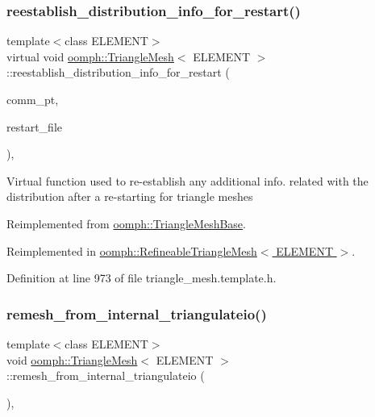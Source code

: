 \subsubsection{\texorpdfstring{reestablish\+\_\+distribution\+\_\+info\+\_\+for\+\_\+restart()}{reestablish\_distribution\_info\_for\_restart()}}
{\footnotesize\ttfamily template$<$class E\+L\+E\+M\+E\+NT$>$ \\
virtual void \hyperlink{classoomph_1_1TriangleMesh}{oomph\+::\+Triangle\+Mesh}$<$ E\+L\+E\+M\+E\+NT $>$\+::reestablish\+\_\+distribution\+\_\+info\+\_\+for\+\_\+restart (\begin{DoxyParamCaption}\item[{\hyperlink{classoomph_1_1OomphCommunicator}{Oomph\+Communicator} $\ast$}]{comm\+\_\+pt,  }\item[{std\+::istream \&}]{restart\+\_\+file }\end{DoxyParamCaption})\hspace{0.3cm}{\ttfamily [inline]}, {\ttfamily [virtual]}}

Virtual function used to re-\/establish any additional info. related with the distribution after a re-\/starting for triangle meshes 

Reimplemented from \hyperlink{classoomph_1_1TriangleMeshBase_ae37b5239c84808e3e66aa0eac4396a2c}{oomph\+::\+Triangle\+Mesh\+Base}.



Reimplemented in \hyperlink{classoomph_1_1RefineableTriangleMesh_a3ecdb3b15c3fefbc96f407c4fdf5b155}{oomph\+::\+Refineable\+Triangle\+Mesh$<$ E\+L\+E\+M\+E\+N\+T $>$}.



Definition at line 973 of file triangle\+\_\+mesh.\+template.\+h.

\mbox{\label{classoomph_1_1TriangleMesh_a9bc95b0f26f8cd352997d2db32a6a292}} 
\subsubsection{\texorpdfstring{remesh\+\_\+from\+\_\+internal\+\_\+triangulateio()}{remesh\_from\_internal\_triangulateio()}}
{\footnotesize\ttfamily template$<$class E\+L\+E\+M\+E\+NT$>$ \\
void \hyperlink{classoomph_1_1TriangleMesh}{oomph\+::\+Triangle\+Mesh}$<$ E\+L\+E\+M\+E\+NT $>$\+::remesh\+\_\+from\+\_\+internal\+\_\+triangulateio (\begin{DoxyParamCaption}{ }\end{DoxyParamCaption})\hspace{0.3cm}{\ttfamily [inline]}, {\ttfamily [virtual]}}



